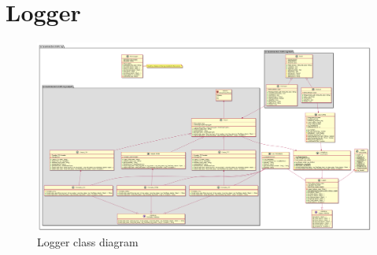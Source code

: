 \section{Logger}
\begin{figure}
	\vspace{1.5em}
  	\caption{Logger class diagram}
  	\label{fig:loogerClassDiag}
  	\centering
  	\includegraphics[width=\textheight]{figs/logger/logModuleClassDiagram.png}
  	\vspace{1.5em}
\end{figure}